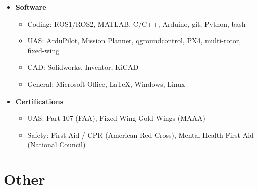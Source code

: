 \documentclass[12pt,letter,sans]{moderncv}
\begin{document}
\begin{itemize}
\vspace{4pt}

\item
{
    \textbf{Software}
        \vspace{3pt} 
        \begin{itemize}
            \item Coding: ROS1/ROS2, MATLAB, C/C++, Arduino, git, Python, bash
            \item UAS: ArduPilot, Mission Planner, qgroundcontrol, PX4, multi-rotor, fixed-wing
            \item CAD: Solidworks, Inventor, KiCAD
            \item General: Microsoft Office, \LaTeX, Windows, Linux
        \end{itemize}
}

\vspace{4pt}

\item
{
    \textbf{Certifications}
        \vspace{3pt} 
        \begin{itemize}
            \item UAS: Part 107 (FAA), Fixed-Wing Gold Wings (MAAA)
            \item Safety: First Aid / CPR (American Red Cross), Mental Health First Aid (National Council)
        \end{itemize}
}

\end{itemize}




\section{Other}
\end{document}
